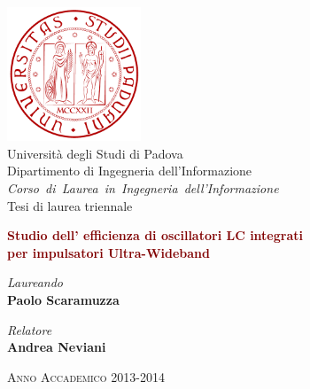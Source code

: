 \documentclass[tex/tesi.tex]{subfiles}
\begin{document}
\begin{center}
	\includegraphics[height=4cm]{images/logounipd} \\
	\vspace{0.4cm}
	\Large{Università degli Studi di Padova} \\
	\vspace{0.5cm}
	\Large{Dipartimento di Ingegneria dell'Informazione} \\
	\vspace{1.5cm}
	\emph{\Large{Corso~di~Laurea~in~Ingegneria~dell'Informazione}} \\
	\vspace{0.5cm}
	\Large{Tesi di laurea triennale} \\
\begin{vplace} %
	\LARGE{\textbf{\textcolor{Maroon}{
		Studio dell' efficienza di oscillatori LC integrati \\ per impulsatori 
		Ultra-Wideband}}}
\end{vplace}
\end{center}

\vfill
\noindent
\begin{minipage}{0.5\textwidth}
\begin{flushleft}
	\large{\textit{Laureando}} \\
	\Large{\textbf{Paolo Scaramuzza}}
\end{flushleft}
\end{minipage}
\noindent
\begin{minipage}{0.5\textwidth}
\begin{flushright}
	\large{\textit{Relatore}} \\
	\Large{\textbf{Andrea Neviani}}
\end{flushright}
\end{minipage}

\vfill
\begin{center}
\textsc{Anno Accademico 2013-2014}
\end{center}
\restoregeometry
\end{document}
